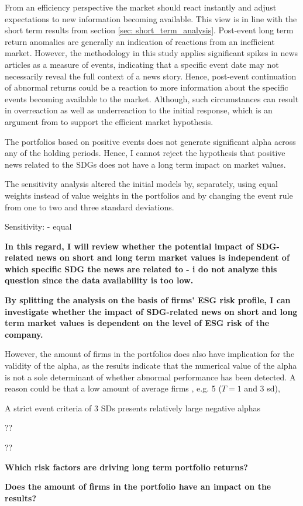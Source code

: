 From an efficiency perspective the market should react instantly and adjust expectations to new information becoming available. This view is in line with the short term results from section \ref{sec: short_term_analysis}. Post-event long term return anomalies are generally an indication of reactions from an inefficient market. However, the methodology in this study applies significant spikes in news articles as a measure of events, indicating that a specific event date may not necessarily reveal the full context of a news story. Hence, post-event continuation of abnormal returns could be a reaction to more information about the specific events becoming available to the market. Although, such circumstances can result in overreaction as well as underreaction to the initial response, which is an argument from \cite{fama1998_events} to support the efficient market hypothesis.   

The portfolios based on positive events does not generate significant alpha across any of the holding periods. Hence, I cannot reject the hypothesis that positive news related to the SDGs does not have a long term impact on market values. 



The sensitivity analysis altered the initial models by, separately, using equal weights instead of value weights in the portfolios and by changing the event rule from one to two and three standard deviations. 



Sensitivity:
- equal

\textbf{In this regard, I will review
whether the potential impact of SDG-related news on short and long term market values
is independent of which specific SDG the news are related to - i do not analyze this question since the data availability is too low.}



\textbf{By splitting the analysis on the basis of firms’
ESG risk profile, I can investigate whether the impact of SDG-related news on short and
long term market values is dependent on the level of ESG risk of the company.}

  However, the amount of firms in the portfolios does also have implication for the validity of the alpha, as the results indicate that the numerical value of the alpha is not a sole determinant of whether abnormal performance has been detected. A reason could be that a low amount of average firms , e.g. 5 ($T = 1$ and 3 sd), 

A strict event criteria of 3 SDs presents relatively large negative alphas

  ??

??






\textbf{Which risk factors are driving long term portfolio returns?}


\textbf{Does the amount of firms in the portfolio have an impact on the results?}
